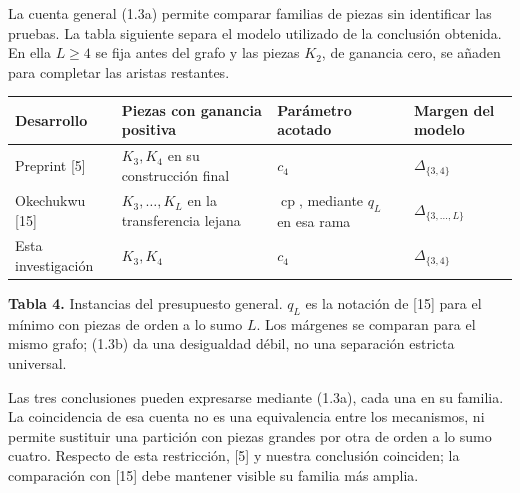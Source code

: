 \documentclass[spanish,11pt,a4paper]{article}
\newcounter{none}
\begin{document}
La cuenta general (1.3a) permite comparar familias de piezas sin identificar las pruebas. La tabla siguiente separa el modelo utilizado de la conclusión obtenida. En ella \(L\ge4\) se fija antes del grafo y las piezas \(K_2\), de ganancia cero, se añaden para completar las aristas restantes.


{\def\LTcaptype{none} %
\begin{longtable}[c]{@{}
  >{\raggedright\arraybackslash}p{}
  >{\raggedright\arraybackslash}p{}
  >{\raggedright\arraybackslash}p{}
  >{\raggedright\arraybackslash}p{}@{}}
\toprule\noalign{}
\begin{minipage}[b]{\linewidth}\raggedright
Desarrollo
\end{minipage} & \begin{minipage}[b]{\linewidth}\raggedright
Piezas con ganancia positiva
\end{minipage} & \begin{minipage}[b]{\linewidth}\raggedright
Parámetro acotado
\end{minipage} & \begin{minipage}[b]{\linewidth}\raggedright
Margen del modelo
\end{minipage} \\
\midrule\noalign{}
\endhead
\bottomrule\noalign{}
\endlastfoot
Preprint {[}5{]} & \(K_3,K_4\) en su construcción final & \(c_4\) & \(\Delta_{\{3,4\}}\) \\
Okechukwu {[}15{]} & \(K_3,\ldots,K_L\) en la transferencia lejana & \(\operatorname{cp}\), mediante \(q_L\) en esa rama & \(\Delta_{\{3,\ldots,L\}}\) \\
Esta investigación & \(K_3,K_4\) & \(c_4\) & \(\Delta_{\{3,4\}}\) \\
\end{longtable}
}

\textbf{Tabla 4.} Instancias del presupuesto general. \(q_L\) es la notación de {[}15{]} para el mínimo con piezas de orden a lo sumo \(L\). Los márgenes se comparan para el mismo grafo; (1.3b) da una desigualdad débil, no una separación estricta universal.

Las tres conclusiones pueden expresarse mediante (1.3a), cada una en su familia. La coincidencia de esa cuenta no es una equivalencia entre los mecanismos, ni permite sustituir una partición con piezas grandes por otra de orden a lo sumo cuatro. Respecto de esta restricción, {[}5{]} y nuestra conclusión coinciden; la comparación con {[}15{]} debe mantener visible su familia más amplia.
\end{document}
